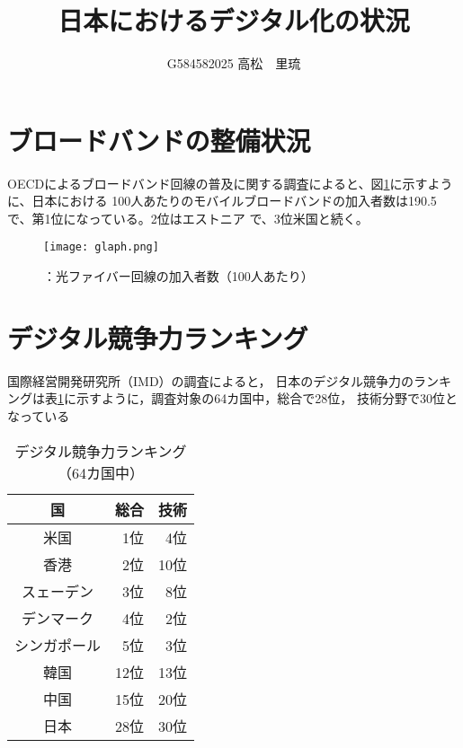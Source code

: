 \documentclass[a4paper,11pt,dvipdfmx]{ujarticle}
\title{日本におけるデジタル化の状況}
\author{G584582025 高松　里琉}
\begin{document}
\maketitle

\section{ブロードバンドの整備状況}

OECDによるブロードバンド回線の普及に関する調査\cite{oecd}によると、図\ref{fig21.png}に示すように、日本における
 100人あたりのモバイルブロードバンドの加入者数は190.5で、第1位になっている。2位はエストニア
で、3位米国と続く。

\begin{figure}[htbp]
    \centering
    \texttt{[image: glaph.png]}
    \caption{：光ファイバー回線の加入者数（100人あたり）}\label{fig21.png}
\end{figure}

\section{デジタル競争力ランキング}

国際経営開発研究所（IMD）の調査\cite{imd}によると，
日本のデジタル競争力のランキングは表\ref{tbl:デジタル}に示すように，調査対象の64カ国中，総合で28位，
技術分野で30位となっている


\begin{table}[htbp]
    \centering
    \caption{デジタル競争力ランキング（64カ国中）}
    \label{tbl:デジタル}

    \begin{tabular}{|c|r|r|}\hline
        国 & 総合 & 技術 \\
        \hline
        米国 & 1位 & 4位 \\
        \hline
        香港 & 2位 & 10位 \\
        \hline
        スェーデン & 3位 & 8位 \\
        \hline
        デンマーク & 4位 & 2位 \\
        \hline
        シンガポール & 5位 & 3位 \\
        \hline
        \hline
        韓国 & 12位 & 13位 \\
        \hline 
        中国 & 15位 & 20位 \\
        \hline
        \hline
        日本 & 28位 & 30位 \\
        \hline
    \end{tabular}
\end{table}
\end{document}
